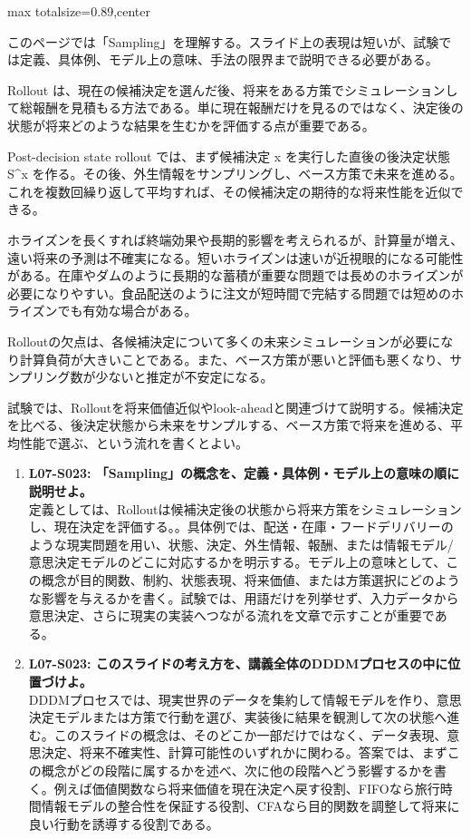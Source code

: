 \begin{minipage}[t]{0.58\textwidth}
\begin{adjustbox}{max totalsize={\textwidth}{0.89\textheight},center}
\begin{minipage}{\textwidth}\scriptsize
{}このページでは「Sampling」を理解する。スライド上の表現は短いが、試験では定義、具体例、モデル上の意味、手法の限界まで説明できる必要がある。\par
Rollout は、現在の候補決定を選んだ後、将来をある方策でシミュレーションして総報酬を見積もる方法である。単に現在報酬だけを見るのではなく、決定後の状態が将来どのような結果を生むかを評価する点が重要である。\par
Post-decision state rollout では、まず候補決定 x を実行した直後の後決定状態 S\textasciicircum{}x を作る。その後、外生情報をサンプリングし、ベース方策で未来を進める。これを複数回繰り返して平均すれば、その候補決定の期待的な将来性能を近似できる。\par
ホライズンを長くすれば終端効果や長期的影響を考えられるが、計算量が増え、遠い将来の予測は不確実になる。短いホライズンは速いが近視眼的になる可能性がある。在庫やダムのように長期的な蓄積が重要な問題では長めのホライズンが必要になりやすい。食品配送のように注文が短時間で完結する問題では短めのホライズンでも有効な場合がある。\par
Rolloutの欠点は、各候補決定について多くの未来シミュレーションが必要になり計算負荷が大きいことである。また、ベース方策が悪いと評価も悪くなり、サンプリング数が少ないと推定が不安定になる。\par
試験では、Rolloutを将来価値近似やlook-aheadと関連づけて説明する。候補決定を比べる、後決定状態から未来をサンプルする、ベース方策で将来を進める、平均性能で選ぶ、という流れを書くとよい。\par{}\begin{enumerate}\item \textbf{L07-S023: 「Sampling」の概念を、定義・具体例・モデル上の意味の順に説明せよ。}\\定義としては、Rolloutは候補決定後の状態から将来方策をシミュレーションし、現在決定を評価する。。具体例では、配送・在庫・フードデリバリーのような現実問題を用い、状態、決定、外生情報、報酬、または情報モデル/意思決定モデルのどこに対応するかを明示する。モデル上の意味として、この概念が目的関数、制約、状態表現、将来価値、または方策選択にどのような影響を与えるかを書く。試験では、用語だけを列挙せず、入力データから意思決定、さらに現実の実装へつながる流れを文章で示すことが重要である。\item \textbf{L07-S023: このスライドの考え方を、講義全体のDDDMプロセスの中に位置づけよ。}\\DDDMプロセスでは、現実世界のデータを集約して情報モデルを作り、意思決定モデルまたは方策で行動を選び、実装後に結果を観測して次の状態へ進む。このスライドの概念は、そのどこか一部だけではなく、データ表現、意思決定、将来不確実性、計算可能性のいずれかに関わる。答案では、まずこの概念がどの段階に属するかを述べ、次に他の段階へどう影響するかを書く。例えば価値関数なら将来価値を現在決定へ戻す役割、FIFOなら旅行時間情報モデルの整合性を保証する役割、CFAなら目的関数を調整して将来に良い行動を誘導する役割である。\end{enumerate}

\end{minipage}
\end{adjustbox}
\end{minipage}
